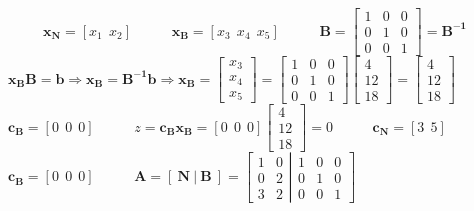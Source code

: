 {\begin{minipage}[l]{14,2cm}
 \ \ \ \ \ $\mathbf{x{_N}}=[x{_1}\ \ x{_2}]$ \ \ \ \ \ $\mathbf{x{_B}}=[x{_3}\ \ x{_4}\ \ x{_5}]$
 \ \ \ \ \ $\mathbf{B}=\begin{bmatrix}
1 & 0 & 0 \\
0 & 1 & 0 \\
0 & 0 & 1
\end{bmatrix} = \mathbf{B^{-1}}$
\\ $\mathbf{x{_B}}\mathbf{B}=\mathbf{b} \Rightarrow \mathbf{x{_B}}=\mathbf{B^{-1}}\mathbf{b}\Rightarrow\mathbf{x{_B}}=\begin{bmatrix}
x{_3} \\
x{_4} \\
x{_5} 
\end{bmatrix} = \begin{bmatrix}
1 & 0 & 0 \\
0 & 1 & 0 \\
0 & 0 & 1
\end{bmatrix}\begin{bmatrix}
4 \\
12 \\
18 
\end{bmatrix} = \begin{bmatrix}
4 \\
12 \\
18 
\end{bmatrix}$ \\$\mathbf{c{_B}}=[0\ \ 0\ \ 0]$
\ \ \ \ \ $z = \mathbf{c{_B}}\mathbf{x{_B}} = [0\ \ 0\ \ 0]\begin{bmatrix}
4 \\
12 \\
18 
\end{bmatrix} = 0$
 \ \ \ \ \ $\mathbf{c{_N}}=[3\ \ 5]$ \ \ \ \ \ $\mathbf{c{_B}}=[0\ \ 0\ \ 0]$ \ \ \ \ \ $\mathbf{A}=[\ \mathbf{N}\ |\ \mathbf{B}\ ]=\left [ \left.\begin{matrix}
1 & 0 \\
0 & 2 \\
3 & 2 
\end{matrix}\right|
\begin{matrix}
1 & 0 & 0 \\
0 & 1 & 0 \\
0 & 0 & 1
\end{matrix} \right ]$ \ \ \ \ \ 
\end{minipage}
}

